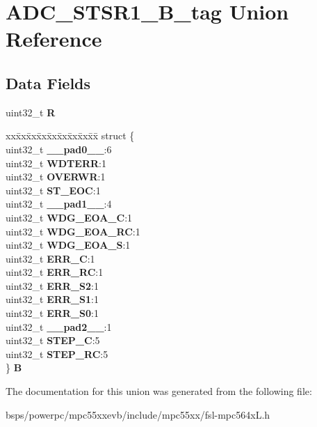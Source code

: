 \hypertarget{unionADC__STSR1__32B__tag}{}\section{A\+D\+C\+\_\+\+S\+T\+S\+R1\+\_\+B\+\_\+tag Union Reference}
\label{unionADC__STSR1__32B__tag}
\subsection*{Data Fields}
\begin{DoxyCompactItemize}
\item 
\mbox{\label{unionADC__STSR1__32B__tag_a3cb4736702df8a8d0390a934cad21f44}} 
uint32\+\_\+t {\bfseries R}
\item 
\mbox{\label{unionADC__STSR1__32B__tag_ade4a204c36551fdb7ef3acb10b933ee0}} 
\begin{tabbing}
xx\=xx\=xx\=xx\=xx\=xx\=xx\=xx\=xx\=\kill
struct \{\\
\>uint32\_t {\bfseries \_\_pad0\_\_}:6\\
\>uint32\_t {\bfseries WDTERR}:1\\
\>uint32\_t {\bfseries OVERWR}:1\\
\>uint32\_t {\bfseries ST\_EOC}:1\\
\>uint32\_t {\bfseries \_\_pad1\_\_}:4\\
\>uint32\_t {\bfseries WDG\_EOA\_C}:1\\
\>uint32\_t {\bfseries WDG\_EOA\_RC}:1\\
\>uint32\_t {\bfseries WDG\_EOA\_S}:1\\
\>uint32\_t {\bfseries ERR\_C}:1\\
\>uint32\_t {\bfseries ERR\_RC}:1\\
\>uint32\_t {\bfseries ERR\_S2}:1\\
\>uint32\_t {\bfseries ERR\_S1}:1\\
\>uint32\_t {\bfseries ERR\_S0}:1\\
\>uint32\_t {\bfseries \_\_pad2\_\_}:1\\
\>uint32\_t {\bfseries STEP\_C}:5\\
\>uint32\_t {\bfseries STEP\_RC}:5\\
\} {\bfseries B}\\

\end{tabbing}\end{DoxyCompactItemize}


The documentation for this union was generated from the following file\+:\begin{DoxyCompactItemize}
\item 
bsps/powerpc/mpc55xxevb/include/mpc55xx/fsl-\/mpc564x\+L.\+h\end{DoxyCompactItemize}
